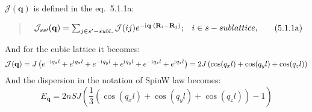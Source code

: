     $\mathcal{J}(\mathbf{q})$ is defined in the eq.~5.1.1a:
    \begin{quote}
        \begin{equation}
            \begin{matrix}
                \mathcal{J}_{ss\prime}(\mathbf{q}) = \sum_{j \in s^{\prime} - subl.} \mathcal{J}(ij)e^{-\mathrm{i}\mkern1mu\mathbf{q}\cdot(\mathbf{R}_i - \mathbf{R}_j)}; & i \in s-sublattice,
            \end{matrix}  
            \label{eq:rem-5.1.1a} \tag{5.1.1a}
        \end{equation}
    \end{quote}
    And for the cubic lattice it becomes:
    \begin{equation}
        \mathcal{J}(\mathbf{q}) = J \left(e^{-\mathrm{i}\mkern1mu q_xl} + e^{\mathrm{i}\mkern1mu q_xl} + e^{-\mathrm{i}\mkern1mu q_yl} + e^{\mathrm{i}\mkern1mu q_yl} + e^{-\mathrm{i}\mkern1mu q_zl} + e^{\mathrm{i}\mkern1mu q_zl}\right) = 
        2J \left(\cos(q_xl) + \cos(q_yl) + \cos(q_zl)\right)
    \end{equation}
    And the dispersion in the notation of SpinW law becomes:
    \begin{equation}
        E_{\mathbf{q}} = 2nSJ\left(\dfrac{1}{3}\left(\cos(q_xl) + \cos(q_yl) + \cos(q_zl)\right) - 1\right)
    \end{equation}
